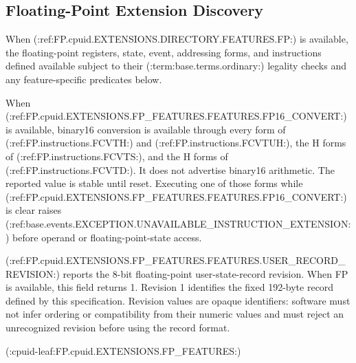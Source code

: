 \subsection{Floating-Point Extension Discovery}
When (:ref:FP.cpuid.EXTENSIONS.DIRECTORY.FEATURES.FP:) is available, the floating-point registers, state, event, addressing forms, and instructions defined
available subject to their (:term:base.terms.ordinary:) legality checks and any feature-specific predicates below.

When (:ref:FP.cpuid.EXTENSIONS.FP_FEATURES.FEATURES.FP16_CONVERT:) is available, binary16 conversion is available
through every form of (:ref:FP.instructions.FCVTH:) and (:ref:FP.instructions.FCVTUH:), the H forms of
(:ref:FP.instructions.FCVTS:), and the H forms of (:ref:FP.instructions.FCVTD:). It does not advertise
binary16 arithmetic. The reported value is stable until reset. Executing one of those forms while
(:ref:FP.cpuid.EXTENSIONS.FP_FEATURES.FEATURES.FP16_CONVERT:) is clear raises
(:ref:base.events.EXCEPTION.UNAVAILABLE_INSTRUCTION_EXTENSION:) before operand or floating-point-state access.

(:ref:FP.cpuid.EXTENSIONS.FP_FEATURES.FEATURES.USER_RECORD_REVISION:) reports the 8-bit floating-point user-state-record revision. When FP is available, this field returns 1. Revision 1 identifies the fixed 192-byte record defined by this specification. Revision values are opaque identifiers: software must not infer ordering or compatibility from their numeric values and must reject an unrecognized revision before using the record format.

(:cpuid-leaf:FP.cpuid.EXTENSIONS.FP_FEATURES:)
